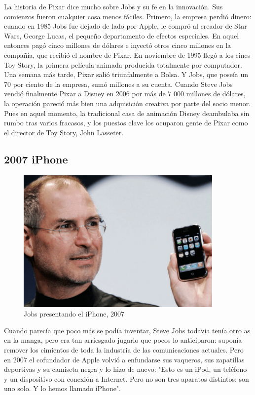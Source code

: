 \documentclass[notumble,10pt,a4paper]{leaflet}
\begin{document}
	La historia de Pixar dice mucho sobre Jobs y su fe en la innovación. Sus comienzos fueron cualquier cosa menos fáciles. Primero, la empresa perdió dinero: cuando en 1985 Jobs fue dejado de lado por Apple, le compró al creador de Star Wars, George Lucas, el pequeño departamento de efectos especiales. En aquel entonces pagó cinco millones de dólares e inyectó otros cinco millones en la compañía, que recibió el nombre de Pixar. 
	En noviembre de 1995 llegó a los cines Toy Story, la primera película animada producida totalmente por computador. Una semana más tarde, Pixar salió triunfalmente a Bolsa. Y Jobs, que poseía un 70 por ciento de la empresa, sumó millones a su cuenta. 
	Cuando Steve Jobs vendió finalmente Pixar a Disney en 2006 por más de 7 000 millones de dólares, la operación pareció más bien una adquisición creativa por parte del socio menor. Pues en aquel momento, la tradicional casa de animación Disney deambulaba sin rumbo tras varios fracasos, y los puestos clave los ocuparon gente de Pixar como el director de Toy Story, John Lasseter. 

\newpage
\subsection{\large{2007 iPhone}}
\begin{figure}[h!]
	\centering
	\includegraphics[width=0.9\textwidth]{img/iphone.png}
	\caption{Jobs presentando el iPhone, 2007}
\end{figure}

	Cuando parecía que poco más se podía inventar, Steve Jobs todavía tenía otro as en la manga, pero era tan arriesgado jugarlo que pocos lo anticiparon: suponía remover los cimientos de toda la industria de las comunicaciones actuales.
	Pero en 2007 el cofundador de Apple volvió a enfundarse sus vaqueros, sus zapatillas deportivas y su camiseta negra y lo hizo de nuevo: "Esto es un iPod, un teléfono y un dispositivo con conexión a Internet. Pero no son tres aparatos distintos: son uno solo. Y lo hemos llamado iPhone".




{}

\end{document}
